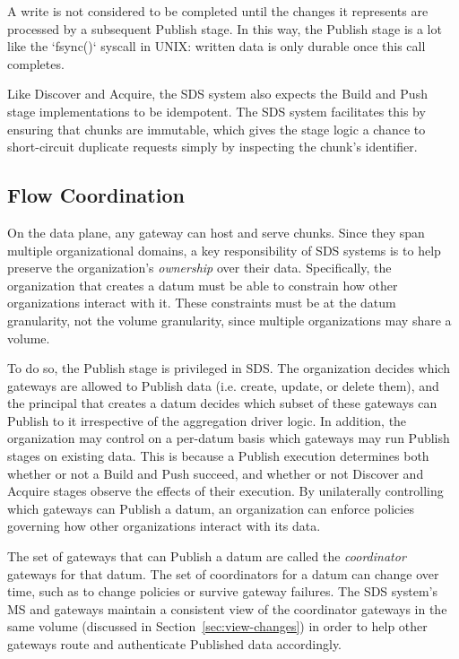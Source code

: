 A write is not considered to be completed until the changes it represents are
processed by a subsequent Publish stage.  In this way, the Publish stage is a lot
like the `fsync()` syscall in UNIX:  written data is only durable once this call
completes.

Like Discover and Acquire, the SDS system also expects the Build and Push stage
implementations to be idempotent.  The SDS system facilitates this by ensuring
that chunks are immutable, which gives the stage logic a chance to short-circuit
duplicate requests simply by inspecting the chunk's identifier.

\subsection{Flow Coordination}

On the data plane, any gateway can host and serve chunks.
Since they span multiple organizational domains, a key responsibility of SDS systems
is to help preserve the organization's \emph{ownership} over their data.
Specifically, the organization that creates a datum
must be able to constrain how other organizations interact with it.  These
constraints must be at the datum granularity, not the volume granularity, since
multiple organizations may share a volume.

To do so, the Publish stage is privileged in SDS.  The organization decides
which gateways are allowed to Publish data (i.e. create, update, or delete
them), and the principal that creates a
datum decides which subset of these gateways can Publish to it irrespective of
the aggregation driver logic.  In addition, the organization may control on a
per-datum basis which gateways may run Publish stages on existing data.
This is because a Publish
execution determines both whether or not a Build and Push succeed, and
whether or not Discover and Acquire stages observe the effects of their
execution.  By unilaterally controlling which gateways can Publish a datum,
an organization can enforce policies governing how other
organizations interact with its data.

The set of gateways that can Publish a datum are called the \emph{coordinator}
gateways for that datum.
The set of coordinators for a datum can change over time, such as to change
policies or survive gateway failures.  The SDS system's MS and gateways
maintain a consistent view of the coordinator gateways in the same volume
(discussed in Section~\ref{sec:view-changes}) in order to help other gateways
route and authenticate Published data accordingly.

